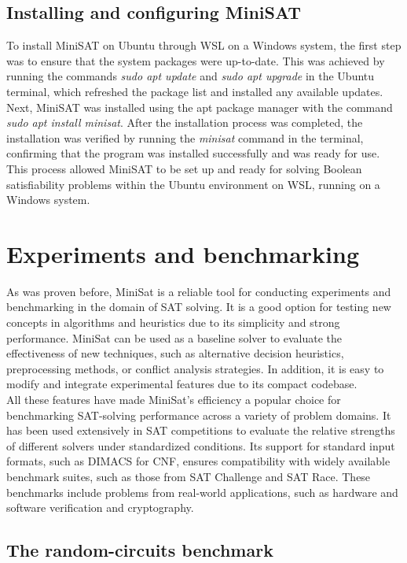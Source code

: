 \documentclass[runningheads]{llncs}
\begin{document}
\subsection{Installing and configuring MiniSAT}

To install MiniSAT on Ubuntu through WSL on a Windows system, the first step was to ensure that the system packages were up-to-date. This was achieved by running the commands \textit{sudo apt update} and \textit{sudo apt upgrade} in the Ubuntu terminal, which refreshed the package list and installed any available updates. Next, MiniSAT was installed using the apt package manager with the command \textit{sudo apt install minisat}. After the installation process was completed, the installation was verified by running the  \textit{minisat} command in the terminal, confirming that the program was installed successfully and was ready for use. This process allowed MiniSAT to be set up and ready for solving Boolean satisfiability problems within the Ubuntu environment on WSL, running on a Windows system. 

\section{Experiments and benchmarking}
As was proven before, MiniSat is a reliable tool for conducting experiments and benchmarking in the domain of SAT solving. It is a good option for testing new concepts in algorithms and heuristics due to its simplicity and strong performance. MiniSat can be used as a baseline solver to evaluate the effectiveness of new techniques, such as alternative decision heuristics, preprocessing methods, or conflict analysis strategies. In addition, it is easy to modify and integrate experimental features due to its compact codebase.
\\
All these features have made MiniSat's efficiency a popular choice for benchmarking SAT-solving performance across a variety of problem domains. It has been used extensively in SAT competitions to evaluate the relative strengths of different solvers under standardized conditions. Its support for standard input formats, such as DIMACS for CNF, ensures compatibility with widely available benchmark suites, such as those from SAT Challenge and SAT Race. These benchmarks include problems from real-world applications, such as hardware and software verification and cryptography.
\subsection{The random-circuits benchmark}
\end{document}
